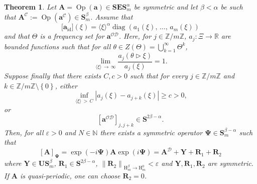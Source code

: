 \documentclass[10pt]{amsart}
\newtheorem{theo}{Theorem}[section]
\theoremstyle{definition}\newtheorem{defi}[theo]{Definition}\newtheorem{rema}[theo]{Remark}\newtheorem{exam}[theo]{Example}\newtheorem{nota}[theo]{Notation}
\DeclareMathOperator{\diag}{diag}
\DeclareMathOperator{\Op}{Op}
\DeclareMathOperator{\id}{id}
\renewcommand{\mathsf}{\mathrm}
\newcommand{\sfH}{\mathsf{H}}
\newcommand{\R}{\mathbb R}
\newcommand{\N}{\mathbb N}
\newcommand{\Z}{\mathbb Z}
\newcommand{\CC}{\mathcal{C}}
\newcommand{\CD}{\mathcal{D}}
\newcommand{\CO}{\mathcal{O}}
\newcommand{\COD}{{\CO\CD}}
\newcommand{\BPsi}{\boldsymbol \Psi}
\newcommand{\ba}{\mathbf a}
\newcommand{\BA}{\mathbf A}
\newcommand{\BE}{\mathbf E}
\newcommand{\BS}{\mathbf S}
\newcommand{\BR}{\mathbf R}
\newcommand{\BU}{\mathbf U}
\newcommand{\BY}{\mathbf Y}
\newcommand{\eps}{\varepsilon}
\newcommand{\act}{\triangleright}
\newcommand{\abs}[1]{\left\lvert #1 \right\rvert}
\newcommand{\set}[1]{\left\{ #1 \right\}}
\newcommand{\norm}[1]{\left\| #1 \right\|}
\newcommand{\ang}[1]{\langle #1 \rangle}
\begin{document}
\begin{theo}\label{thm:systemonestep}
Let $\BA = \Op(\ba) \in \BS\BE\BS_m^\alpha$ be symmetric and let $\beta <
\alpha$ be such that $\BA^{\CC}:= \Op(\ba^{\CC}) \in \BS^\beta_m$. Assume that
\begin{equation}
\big[\ba_{\id}\big]\left(\xi \right) = \ang \xi^\alpha
\diag(a_1(\xi),\,\dotsc,\,a_m(\xi))
\end{equation}
and that $\Theta$ is a frequency set for $\ba^\COD$. Here, for $j \in \Z/m\Z$, $a_j : \Xi \to \R$ are bounded functions such that for all $\theta \in Z(\Theta) = \bigcup_{k=1}^\infty \Theta^k$,
\begin{equation}\label{eq:shftinfty}
\lim_{\ang \xi\,\to\,\infty} \frac{a_j(\theta \act \xi)}{a_j(\xi)} = 1.
\end{equation}
Suppose finally that there exists $C, c> 0$ such that for every $j \in \Z/m\Z$ and $k \in \Z / m \Z
\setminus \set{0}$, either
\begin{equation}\label{eq:ajboundfrombelow}
\inf_{\ang \xi\,>\,C} \abs{a_j(\xi) - a_{j+k}(\xi)} \ge c > 0,
\end{equation}
or
\begin{equation}\label{eq:hypresonant}
\left[\ba^{\COD}\right]_{j,j+k} \in \BS^{2\beta - \alpha}.
\end{equation}
Then, for all $\eps > 0$ and $N \in \N$ there exists a symmetric operator $\BPsi \in \BS_m^{\beta - \alpha}$ such that
\begin{equation}\label{eq:desiredafteronestep}
[\BA]_{\BPsi} = \exp(-i\BPsi) \BA \exp(i\BPsi) = \BA^\CD + \BY + \BR_1 + \BR_2
\end{equation}
where $\BY \in \BU\BS_m^\beta$, $\BR_1 \in \BS^{2 \beta - \alpha}$, $\norm{\BR_2}_{\sfH^\beta_m \to \sfH_m^0} < \eps$ and $\BY, \BR_1,
\BR_2$ are symmetric. If $\BA$ is quasi-periodic, one can choose $\BR_2 = 0$.
\end{theo}
\end{document}
